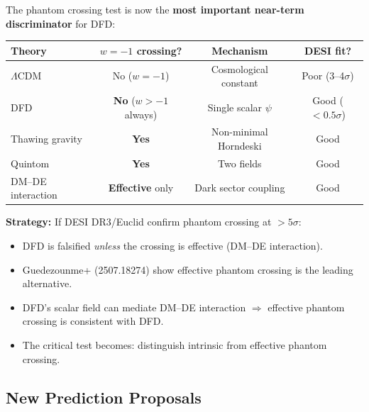 \documentclass[11pt,a4paper]{article}
\begin{document}
The phantom crossing test is now the \textbf{most important near-term discriminator} for DFD:

\begin{center}
\begin{tabular}{lccc}
\toprule
\textbf{Theory} & \textbf{$w = -1$ crossing?} & \textbf{Mechanism} & \textbf{DESI fit?} \\
\midrule
$\Lambda$CDM & No ($w = -1$) & Cosmological constant & Poor (3--4$\sigma$) \\
DFD & \textbf{No} ($w > -1$ always) & Single scalar $\psi$ & Good ($< 0.5\sigma$) \\
Thawing gravity & \textbf{Yes} & Non-minimal Horndeski & Good \\
Quintom & \textbf{Yes} & Two fields & Good \\
DM--DE interaction & \textbf{Effective} only & Dark sector coupling & Good \\
\bottomrule
\end{tabular}
\end{center}

\textbf{Strategy:} If DESI DR3/Euclid confirm phantom crossing at $>5\sigma$:
\begin{itemize}
\item DFD is falsified \emph{unless} the crossing is effective (DM--DE interaction).
\item Guedezounme+ (2507.18274) show effective phantom crossing is the leading alternative.
\item DFD's scalar field can mediate DM--DE interaction $\Rightarrow$ effective phantom crossing is consistent with DFD.
\item The critical test becomes: distinguish intrinsic from effective phantom crossing.
\end{itemize}

\subsection{New Prediction Proposals}
\end{document}

